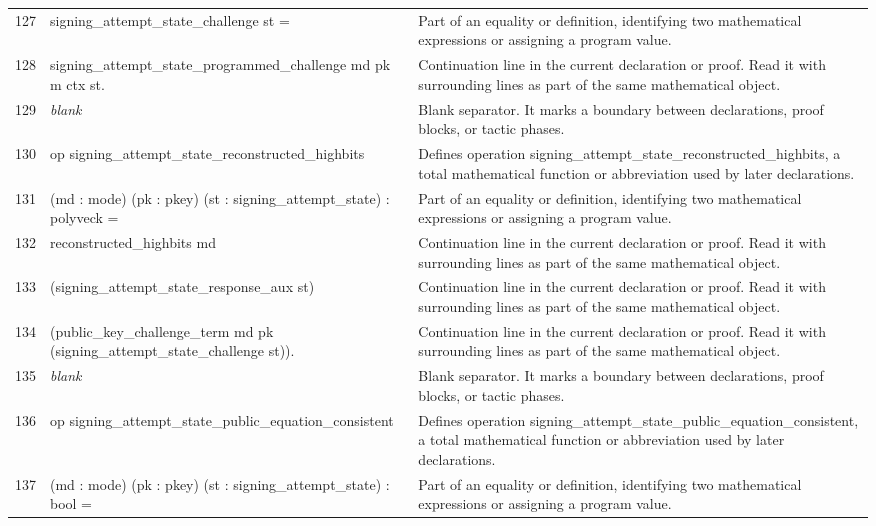 \documentclass[10pt]{article}
\begin{document}
\begin{longtable}{r L{0.53\textwidth} L{0.37\textwidth}}
127 & {\ttfamily\scriptsize   signing\_attempt\_state\_challenge st =} & Part of an equality or definition, identifying two mathematical expressions or assigning a program value. \\
128 & {\ttfamily\scriptsize     signing\_attempt\_state\_programmed\_challenge md pk m ctx st.} & Continuation line in the current declaration or proof.  Read it with surrounding lines as part of the same mathematical object. \\
129 & {\ttfamily\scriptsize \emph{blank}} & Blank separator.  It marks a boundary between declarations, proof blocks, or tactic phases. \\
130 & {\ttfamily\scriptsize op signing\_attempt\_state\_reconstructed\_highbits} & Defines operation signing\_attempt\_state\_reconstructed\_highbits, a total mathematical function or abbreviation used by later declarations. \\
131 & {\ttfamily\scriptsize    (md : mode) (pk : pkey) (st : signing\_attempt\_state) : polyveck =} & Part of an equality or definition, identifying two mathematical expressions or assigning a program value. \\
132 & {\ttfamily\scriptsize   reconstructed\_highbits md} & Continuation line in the current declaration or proof.  Read it with surrounding lines as part of the same mathematical object. \\
133 & {\ttfamily\scriptsize     (signing\_attempt\_state\_response\_aux st)} & Continuation line in the current declaration or proof.  Read it with surrounding lines as part of the same mathematical object. \\
134 & {\ttfamily\scriptsize     (public\_key\_challenge\_term md pk (signing\_attempt\_state\_challenge st)).} & Continuation line in the current declaration or proof.  Read it with surrounding lines as part of the same mathematical object. \\
135 & {\ttfamily\scriptsize \emph{blank}} & Blank separator.  It marks a boundary between declarations, proof blocks, or tactic phases. \\
136 & {\ttfamily\scriptsize op signing\_attempt\_state\_public\_equation\_consistent} & Defines operation signing\_attempt\_state\_public\_equation\_consistent, a total mathematical function or abbreviation used by later declarations. \\
137 & {\ttfamily\scriptsize    (md : mode) (pk : pkey) (st : signing\_attempt\_state) : bool =} & Part of an equality or definition, identifying two mathematical expressions or assigning a program value. \\

\end{longtable}
\end{document}
